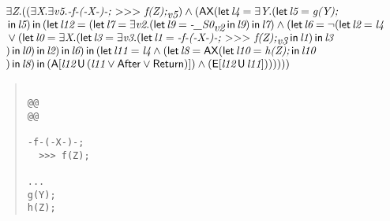 \documentclass{article}
\newcommand{\U}{\,\mbox{\sf{U}}\,}
\newcommand{\A}{\mbox{\sf{A}}}
\newcommand{\E}{\mbox{\sf{E}}}
\newcommand{\AX}{\mbox{\sf{AX}}}
\newcommand{\mita}[1]{\mbox{\it{{#1}}}}
\newcommand{\msf}[1]{\mbox{\sf{{#1}}}}
\newcommand{\mth}[1]{\({#1}\)}
\begin{document}
\[\begin{array}{l}
\exists \mita{Z} . ((\exists \mita{X} . \exists \mita{v5} . \mita{-f-(-X-)-;
  \mth{>}\mth{>}\mth{>} f(Z);}_{\mita{v5}}) \wedge (\AX(\mita{\sf{let}} \, \mita{l4} = \exists \mita{Y} . (\mita{\sf{let}} \, \mita{l5} = \mita{g(Y);}\\\mbox{} \, \mita{\sf{in}} \, \mita{l5}
) \, \mita{\sf{in}} \, (\mita{\sf{let}} \, \mita{l12} = (\mita{\sf{let}} \, \mita{l7} = \exists \mita{v2} . (\mita{\sf{let}} \, \mita{l9} = \mita{-\_S0}_{\mita{v2}} \, \mita{\sf{in}} \, \mita{l9}
) \, \mita{\sf{in}} \, \mita{l7}
) \wedge (\mita{\sf{let}} \, \mita{l6} = \neg (\mita{\sf{let}} \, \mita{l2} = \mita{l4}\\\mbox{} \vee (\mita{\sf{let}} \, \mita{l0} = \exists \mita{X} . (\mita{\sf{let}} \, \mita{l3} = \exists \mita{v3} . (\mita{\sf{let}} \, \mita{l1} = \mita{-f-(-X-)-;
  \mth{>}\mth{>}\mth{>} f(Z);}_{\mita{v3}} \, \mita{\sf{in}} \, \mita{l1}
) \, \mita{\sf{in}} \, \mita{l3}\\\mbox{}
) \, \mita{\sf{in}} \, \mita{l0}
) \, \mita{\sf{in}} \, \mita{l2}
) \, \mita{\sf{in}} \, \mita{l6}
) \, \mita{\sf{in}} \, (\mita{\sf{let}} \, \mita{l11} = \mita{l4} \wedge (\mita{\sf{let}} \, \mita{l8} = \AX(\mita{\sf{let}} \, \mita{l10} = \mita{h(Z);} \, \mita{\sf{in}} \, \mita{l10}\\\mbox{}
) \, \mita{\sf{in}} \, \mita{l8}
) \, \mita{\sf{in}} \, (\A[\mita{l12} \U (\mita{l11} \vee \msf{After} \vee \msf{Return})]
) \wedge (\E[\mita{l12} \U \mita{l11}]
)
)
)
)))
\end{array}\]

\begin{quote}\begin{verbatim}

@@
@@

-f-(-X-)-;
  >>> f(Z);

...
g(Y);
h(Z);
\end{verbatim}\end{quote}
\end{document}

